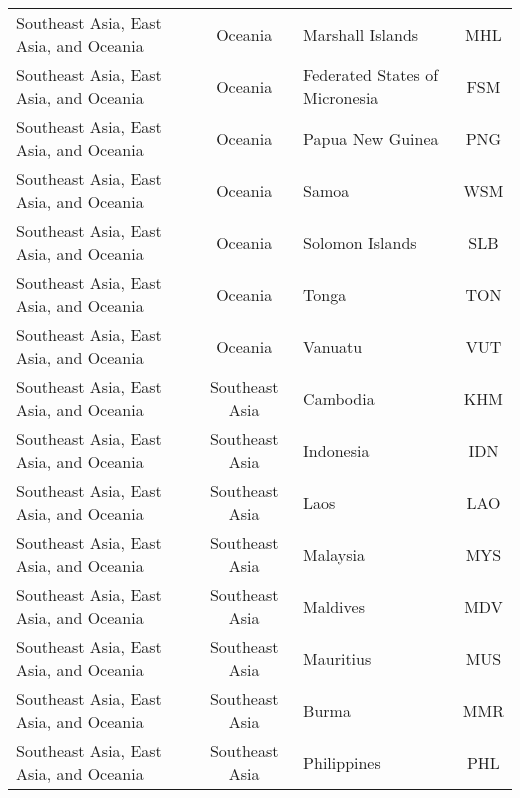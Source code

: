 \begin{landscape}
\begin{longtable}{|p{6cm}|c|p{5cm}|c|}
           Southeast Asia, East Asia, and Oceania &                      Oceania &                                  Marshall Islands &  MHL \\
           Southeast Asia, East Asia, and Oceania &                      Oceania &    \raggedright    Federated States of Micronesia &  FSM \\
           Southeast Asia, East Asia, and Oceania &                      Oceania &                                  Papua New Guinea &  PNG \\
           Southeast Asia, East Asia, and Oceania &                      Oceania &                                             Samoa &  WSM \\
           Southeast Asia, East Asia, and Oceania &                      Oceania &                                   Solomon Islands &  SLB \\
           Southeast Asia, East Asia, and Oceania &                      Oceania &                                             Tonga &  TON \\
           Southeast Asia, East Asia, and Oceania &                      Oceania &                                           Vanuatu &  VUT \\
           Southeast Asia, East Asia, and Oceania &               Southeast Asia &                                          Cambodia &  KHM \\
           Southeast Asia, East Asia, and Oceania &               Southeast Asia &                                         Indonesia &  IDN \\
           Southeast Asia, East Asia, and Oceania &               Southeast Asia &                                              Laos &  LAO \\
           Southeast Asia, East Asia, and Oceania &               Southeast Asia &                                          Malaysia &  MYS \\
           Southeast Asia, East Asia, and Oceania &               Southeast Asia &                                          Maldives &  MDV \\
           Southeast Asia, East Asia, and Oceania &               Southeast Asia &                                         Mauritius &  MUS \\
           Southeast Asia, East Asia, and Oceania &               Southeast Asia &                                             Burma &  MMR \\
           Southeast Asia, East Asia, and Oceania &               Southeast Asia &                                       Philippines &  PHL \\

\end{longtable}
\end{landscape}
